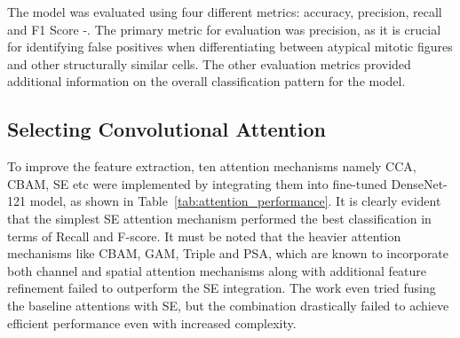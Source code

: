 \documentclass[conference]{IEEEtran}
\begin{document}
The model was evaluated using four different metrics: accuracy, precision, recall and F1 Score \cite{ravi}-\cite{asswin}. The primary metric for evaluation was precision, as it is crucial for identifying false positives when differentiating between atypical mitotic figures and other structurally similar cells. The other evaluation metrics provided additional information on the overall classification pattern for the model.

\subsection{Selecting Convolutional Attention}


To improve the feature extraction, ten attention mechanisms namely CCA, CBAM, SE etc were implemented by integrating them into fine-tuned DenseNet-121 model, as shown in Table~\ref{tab:attention_performance}. It is clearly evident that the simplest SE attention mechanism performed the best classification in terms of Recall and F-score. It must be noted that the heavier attention mechanisms like CBAM, GAM, Triple and PSA, which are known to incorporate both channel and spatial attention mechanisms along with additional feature refinement failed to outperform the SE integration. The work even tried fusing the baseline attentions with SE, but the combination drastically failed to achieve efficient performance even with increased complexity.

\begin{table}[htbp]
\caption{Convolutional Attention Performance Comparison}
\label{tab:attention_performance}
\centering
{}
\end{table}
\end{document}
